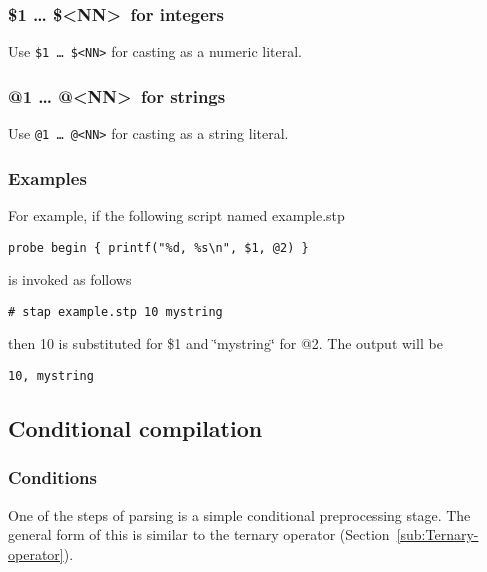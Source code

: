 \documentclass[twoside,english]{article}
\newenvironment{vindent}
{\begin{list}{}{\setlength{\listparindent}{6pt}}
\item[]}
{\end{list}}
\begin{document}
\subsubsection{\$1 \ldots{} \$\textless NN\textgreater\ for integers}
\index{\$}
Use \texttt{\$1 \ldots{} \$<NN>} for casting as a numeric literal.


\subsubsection{@1 \ldots{} @\textless NN\textgreater\ for strings}

Use \texttt{@1 \ldots{} @<NN>} for casting as a string literal.


\subsubsection{Examples}

For example, if the following script named example.stp

\begin{vindent}
\begin{verbatim}
probe begin { printf("%d, %s\n", $1, @2) }
\end{verbatim}
\end{vindent}
is invoked as follows

\begin{vindent}
\begin{verbatim}
# stap example.stp 10 mystring
\end{verbatim}
\end{vindent}
then 10 is substituted for \$1 and \char`\"{}mystring\char`\"{} for @2. The
output will be

\begin{vindent}
\begin{verbatim}
10, mystring
\end{verbatim}
\end{vindent}

\subsection{Conditional compilation}


\subsubsection{Conditions}
One of the steps of parsing is a simple conditional preprocessing stage.
The general form of this is similar to the ternary operator (Section~\ref{sub:Ternary-operator}).
\end{document}
